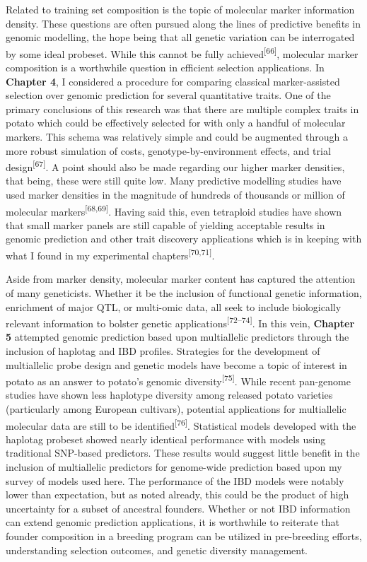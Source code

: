 Related to training set composition is the topic of molecular marker
information density. These questions are often pursued along the lines
of predictive benefits in genomic modelling, the hope being that all
genetic variation can be interrogated by some ideal probeset. While
this cannot be fully achieved\textsuperscript{{[}66{]}}, molecular marker
composition is a worthwhile question in efficient selection
applications. In \textbf{Chapter 4}, I considered a procedure for
comparing classical marker-assisted selection over genomic prediction
for several quantitative traits. One of the primary conclusions of this
research was that there are multiple complex traits in potato which
could be effectively selected for with only a handful of molecular
markers. This schema was relatively simple and could be augmented
through a more robust simulation of costs, genotype-by-environment
effects, and trial design\textsuperscript{{[}67{]}}. A point should also
be made regarding our higher marker densities, that being, these were
still quite low. Many predictive modelling studies have used marker
densities in the magnitude of hundreds of thousands or million of
molecular markers\textsuperscript{{[}68,69{]}}. Having said this, even
tetraploid studies have shown that small marker panels are still capable
of yielding acceptable results in genomic prediction and other trait
discovery applications which is in keeping with what I found in my
experimental chapters\textsuperscript{{[}70,71{]}}.

Aside from marker density, molecular marker content has captured the
attention of many geneticists. Whether it be the inclusion of functional
genetic information, enrichment of major QTL, or multi-omic data, all
seek to include biologically relevant information to bolster genetic
applications\textsuperscript{{[}72--74{]}}. In this vein,
\textbf{Chapter 5} attempted genomic prediction based upon multiallelic
predictors through the inclusion of haplotag and IBD profiles.
Strategies for the development of multiallelic probe design and genetic
models have become a topic of interest in potato as an answer to
potato's genomic diversity\textsuperscript{{[}75{]}}. While recent
pan-genome studies have shown less haplotype diversity among released
potato varieties (particularly among European cultivars),
potential applications for multiallelic molecular data are still to be
identified\textsuperscript{{[}76{]}}. Statistical models developed with
the haplotag probeset showed nearly identical performance with models
using traditional SNP-based predictors. These results would suggest
little benefit in the inclusion of multiallelic predictors for
genome-wide prediction based upon my survey of models used here. The
performance of the IBD models were notably lower than expectation, but
as noted already, this could be the product of high uncertainty for a
subset of ancestral founders. Whether or not IBD information can extend
genomic prediction applications, it is worthwhile to reiterate that
founder composition in a breeding program can be utilized in
pre-breeding efforts, understanding selection outcomes, and genetic
diversity management.

